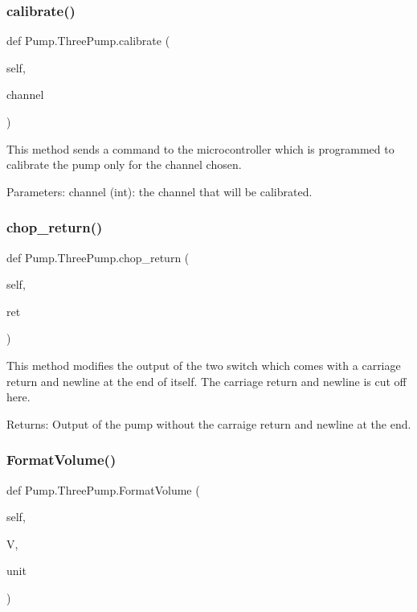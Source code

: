 \subsubsection{\texorpdfstring{calibrate()}{calibrate()}}
{\footnotesize\ttfamily def Pump.\+Three\+Pump.\+calibrate (\begin{DoxyParamCaption}\item[{}]{self,  }\item[{}]{channel }\end{DoxyParamCaption})}

\begin{DoxyVerb}This method sends a command to the microcontroller which is programmed to calibrate the pump only for the channel chosen.

Parameters:
    channel (int): the channel that will be calibrated.
\end{DoxyVerb}
 \mbox{\label{class_pump_1_1_three_pump_adf760719a9c718d5aec4a70a8c8cab9e}} 
\subsubsection{\texorpdfstring{chop\_return()}{chop\_return()}}
{\footnotesize\ttfamily def Pump.\+Three\+Pump.\+chop\+\_\+return (\begin{DoxyParamCaption}\item[{}]{self,  }\item[{}]{ret }\end{DoxyParamCaption})}

\begin{DoxyVerb}This method modifies the output of the two switch which comes with a carriage return and newline at the end of itself.
The carriage return and newline is cut off here.

Returns:
    Output of the pump without the carraige return and newline at the end.
\end{DoxyVerb}
 \mbox{\label{class_pump_1_1_three_pump_addb4b4c6c1259f82c3a7af393719f02e}} 
\subsubsection{\texorpdfstring{FormatVolume()}{FormatVolume()}}
{\footnotesize\ttfamily def Pump.\+Three\+Pump.\+Format\+Volume (\begin{DoxyParamCaption}\item[{}]{self,  }\item[{}]{V,  }\item[{}]{unit }\end{DoxyParamCaption})}

